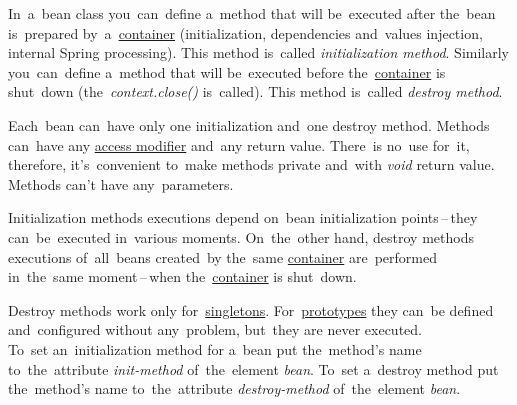 In~a~bean class you~can~define a~method that will be~executed after the~bean is~prepared by~a~\hyperref[springcontainrer]{container} (initialization, dependencies and~values injection, internal Spring processing). This method is~called \textit{initialization method}. Similarly you~can~define a~method that will be~executed before the~\hyperref[springcontainrer]{container} is shut~down (the~\textit{context.close()} is~called). This method is~called \textit{destroy method}.

Each~bean can~have only one initialization and~one destroy method. Methods can~have any \hyperref[accessmodifiers]{access modifier} and~any return value. There~is no~use for~it, therefore, it's~convenient to~make methods private and~with \textit{void} return value. Methods can't have any~parameters.

Initialization methods executions depend on~bean initialization points\,--\,they can~be~executed in~various moments. On~the~other hand, destroy methods executions of~all~beans created~by the~same \hyperref[springcontainrer]{container} are~performed in~the~same moment\,--\,when the~\hyperref[springcontainrer]{container} is shut~down.

\warning Destroy methods work only for~\hyperref[singletondp]{singletons}. For~\hyperref[prototypedp]{prototypes} they can~be defined and~configured without any~problem, but~they are never executed.\\

\noindent To~set an~initialization method for a~bean put the~method's name to~the~attribute \textit{init-method} of~the~element \textit{bean}. To~set a~destroy method put the~method's name to~the~attribute \textit{destroy-method} of~the~element \textit{bean}.
\newpage

